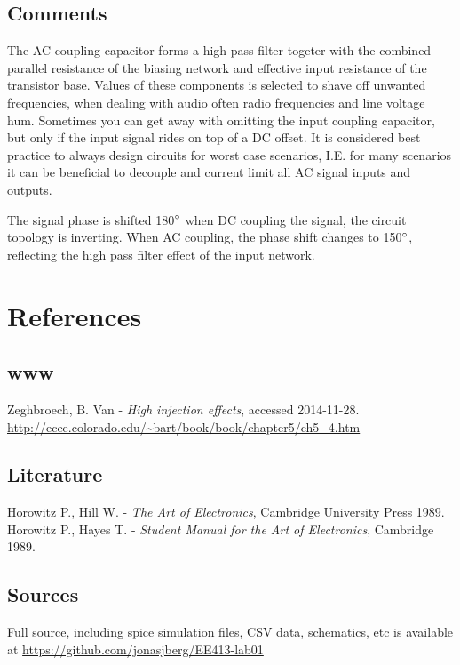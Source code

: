 \documentclass[11pt,a4paper]{article}
\begin{document}
\subsection{Comments}\label{comments}
The AC coupling capacitor forms a high pass filter togeter with the combined
parallel resistance of the biasing network and effective input resistance of
the transistor base. Values of these components is selected to shave off unwanted
frequencies, when dealing with audio often radio frequencies and line voltage hum.
Sometimes you can get away with omitting the input coupling capacitor, but only
if the input signal rides on top of a DC offset. It is considered best practice
to always design circuits for worst case scenarios, I.E. for many scenarios it 
can be beneficial to decouple and current limit all AC signal inputs and outputs.

The signal phase is shifted 180$\degree$ when DC coupling the signal, the circuit topology
is inverting. When AC coupling, the phase shift changes to 150$\degree$, reflecting the high pass filter
effect of the input network.

\pagebreak
\section{References}\label{references}

\subsection{www}\label{www}
Zeghbroech, B. Van - \textit{High injection effects}, accessed 2014-11-28. \\
\url{http://ecee.colorado.edu/~bart/book/book/chapter5/ch5_4.htm}

\subsection{Literature}\label{literature}

Horowitz P., Hill W. -  \textit{The Art of Electronics}, Cambridge University Press 1989.\\
\medskip 
Horowitz P., Hayes T. - \textit{Student Manual for the Art of Electronics}, Cambridge 1989.

\subsection{Sources}\label{sources}
Full source, including spice simulation files, CSV data, schematics, etc
is available at \url{https://github.com/jonasjberg/EE413-lab01}


\end{document}

